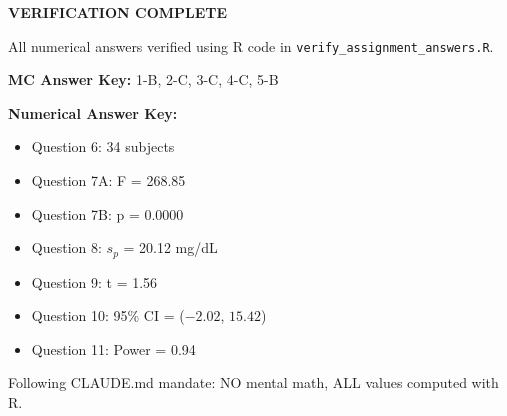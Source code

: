 \documentclass[11pt]{article}
\begin{document}
\vspace{1cm}

\begin{tcolorbox}[colback=green!5,colframe=green!50!black,boxrule=1pt,arc=0pt]
\textbf{VERIFICATION COMPLETE}

All numerical answers verified using R code in \texttt{verify\_assignment\_answers.R}.

\textbf{MC Answer Key:} 1-B, 2-C, 3-C, 4-C, 5-B

\textbf{Numerical Answer Key:}
\begin{itemize}
\item Question 6: 34 subjects
\item Question 7A: F = 268.85
\item Question 7B: p = 0.0000
\item Question 8: $s_p$ = 20.12 mg/dL
\item Question 9: t = 1.56
\item Question 10: 95\% CI = ($-2.02$, $15.42$)
\item Question 11: Power = 0.94
\end{itemize}

Following CLAUDE.md mandate: NO mental math, ALL values computed with R.
\end{tcolorbox}
\end{document}
